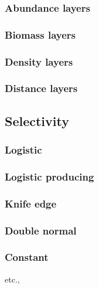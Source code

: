 \subsubsection{Abundance layers}

\subsubsection{Biomass layers}

\subsubsection{Density layers}

\subsubsection{Distance layers}

\subsection{Selectivity}

\subsubsection{Logistic}

\subsubsection{Logistic producing}

\subsubsection{Knife edge}

\subsubsection{Double normal}

\subsubsection{Constant}


etc.,
